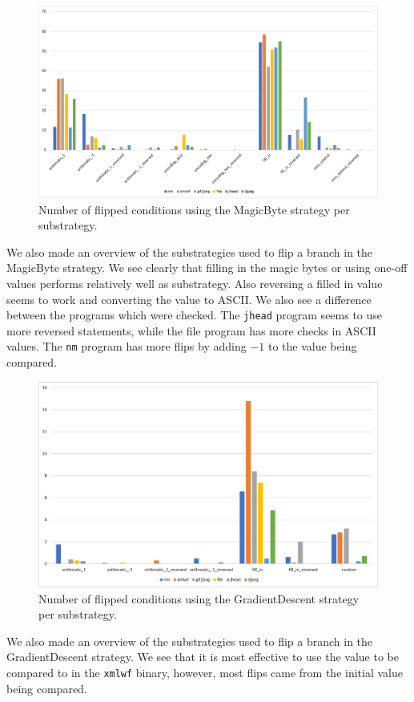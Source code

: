 \begin{figure}[H]
    \centering
    \includegraphics[width=.8\linewidth]{5_results/graphs/magic-byte-substrategy.png}  
    \caption{Number of flipped conditions using the MagicByte strategy per substrategy.}
    \label{fig:magicByteSubstrategies}
\end{figure}
We also made an overview of the substrategies used to flip a branch in the MagicByte strategy. We see clearly that filling in the magic bytes or using one-off values performs relatively well as substrategy. Also reversing a filled in value seems to work and converting the value to ASCII. We also see a difference between the programs which were checked. The \texttt{jhead} program seems to use more reversed statements, while the file program has more checks in ASCII values. The \texttt{nm} program has more flips by adding $-1$ to the value being compared.


\begin{figure}[H]
    \centering
    \includegraphics[width=.8\linewidth]{5_results/graphs/gradient-descent-substrategy.png}  
    \caption{Number of flipped conditions using the GradientDescent strategy per substrategy.}
    \label{fig:gradientDescentSubstrategies}
\end{figure}
We also made an overview of the substrategies used to flip a branch in the GradientDescent strategy. We see that it is most effective to use the value to be compared to in the \texttt{xmlwf} binary, however, most flips came from the initial value being compared.

